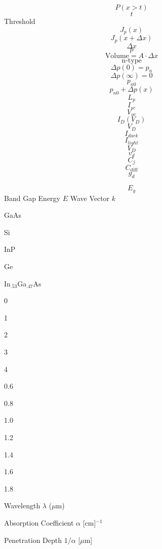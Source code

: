 \documentclass[letterpaper 12pt]{book}
\begin{document}
\[ P(x > t) \]
\[ t \]
Threshold
\[ J_p(x) \]
\[ J_p(x + \Delta x) \]
\[ \Delta x \]
\[ p \]
\[ \text{Volume} = A \cdot \Delta x \]
\[ \text{n-type} \]
\[ \Delta p (0) = p_n \]
\[ \Delta p (\infty) = 0 \]
\[ p_{n0} \]
\[ p_{n0} + \Delta p(x) \]
\[ L_p \]
\[ I_{sc} \]
\[ V_{oc} \]
\[ I_D(V_D) \]
\[ V_D \]
\[ I_{dark} \]
\[ I_{light} \]
\[ V_D \]
\[ v_d \]
\[ C_j \]
\[ C_{\text{diff}} \]
\[ g_d \]

\[ E_{g} \]
Band Gap
Energy $E$
Wave Vector $k$

GaAs

Si

InP

Ge

In$_{.53}$Ga$_{.47}$As

0   

1    

2   

3   

4

0.6

0.8

1.0

1.2

1.4

1.6

1.8

Wavelength $\lambda$ ($\mu$m)

Absorption Coefficient $\alpha$ [cm]$^{-1}$

Penetration Depth $1/\alpha$ [$\mu$m]


 
\end{document}
